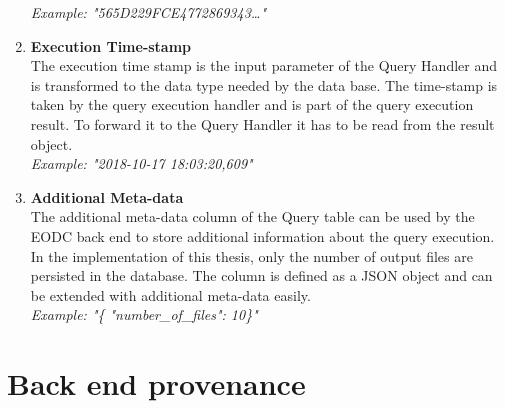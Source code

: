 \documentclass[draft,final]{vutinfth} %
\begin{document}
\begin{enumerate}
	\textit{Example: "565D229FCE4772869343\dots"} 
	\item \textbf{Execution Time-stamp} \\
	The execution time stamp is the input parameter of the Query Handler and is transformed to the data type needed by the data base. The time-stamp is taken by the query execution handler and is part of the query execution result. To forward it to the Query Handler it has to be read from the result object. \\
	\textit{Example: "2018-10-17 18:03:20,609"}  
	\item \textbf{Additional Meta-data} \\
	The additional meta-data column of the Query table can be used by the EODC back end to store additional information about the query execution. In the implementation of this thesis, only the number of output files are persisted in the database. The column is defined as a JSON object and can be extended with additional meta-data easily. \\
	\textit{Example: "\{ "number\_of\_files": 10\}"}    	 
\end{enumerate}


\section{Back end provenance}\label{Implementation:Back end provenance}
\end{document}
